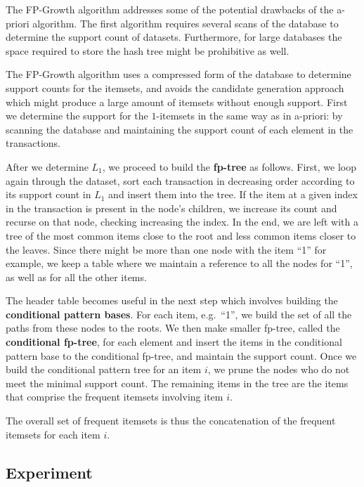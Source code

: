 \documentclass[
  paper=a4,
,captions=tableheading
]{scrartcl}
\begin{document}
The FP-Growth algorithm addresses some of the potential drawbacks of the
a-priori algorithm. The first algorithm requires several scans of the
database to determine the support count of datasets. Furthermore, for
large databases the space required to store the hash tree might be
prohibitive as well.

The FP-Growth algorithm uses a compressed form of the database to
determine support counts for the itemsets, and avoids the candidate
generation approach which might produce a large amount of itemsets
without enough support. First we determine the support for the
\(1\)-itemsets in the same way as in a-priori: by scanning the database
and maintaining the support count of each element in the transactions.

After we determine \(L_{1}\), we proceed to build the \textbf{fp-tree}
as follows. First, we loop again through the dataset, sort each
transaction in decreasing order according to its support count in
\(L_{1}\) and insert them into the tree. If the item at a given index in
the transaction is present in the node's children, we increase its count
and recurse on that node, checking increasing the index. In the end, we
are left with a tree of the most common items close to the root and less
common items closer to the leaves. Since there might be more than one
node with the item ``1'' for example, we keep a table where we maintain
a reference to all the nodes for ``1'', as well as for all the other
items.

The header table becomes useful in the next step which involves building
the \textbf{conditional pattern bases}. For each item, e.g.~``1'', we
build the set of all the paths from these nodes to the roots. We then
make smaller fp-tree, called the \textbf{conditional fp-tree}, for each
element and insert the items in the conditional pattern base to the
conditional fp-tree, and maintain the support count. Once we build the
conditional pattern tree for an item \(i\), we prune the nodes who do
not meet the minimal support count. The remaining items in the tree are
the items that comprise the frequent itemsets involving item \(i\).

The overall set of frequent itemsets is thus the concatenation of the
frequent itemsets for each item \(i\).

\hypertarget{experiment}{%
\subsection{Experiment}\label{experiment}}
\end{document}
